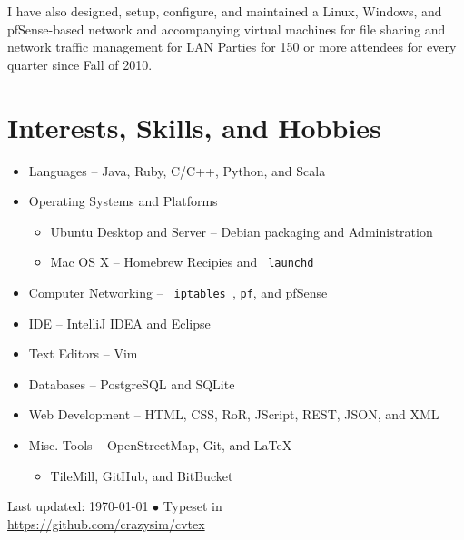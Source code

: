 \documentclass[10pt,a4paper]{article}
\begin{document}
I have also designed, setup, configure, and maintained a Linux, Windows, and pfSense-based
network and accompanying virtual machines for file sharing and network traffic
management for LAN Parties for 150 or more attendees for every quarter since Fall of 2010.

\section*{Interests, Skills, and Hobbies}

\begin{itemize}
    \item Languages -- Java, Ruby, C/C++, Python, and Scala
    \item Operating Systems and Platforms
        \begin{itemize}
            \item Ubuntu Desktop and Server -- Debian packaging and Administration
            \item Mac OS X -- Homebrew Recipies and \texttt{ launchd }
        \end{itemize}
    \item Computer Networking -- \texttt{ iptables }, \texttt{pf}, and pfSense
    \item IDE -- IntelliJ IDEA and Eclipse
    \item Text Editors -- Vim
    \item Databases -- PostgreSQL and SQLite
    \item Web Development -- HTML, CSS, RoR, JScript, REST, JSON, and XML
    \item Misc. Tools -- OpenStreetMap, Git, and \LaTeX
        \begin{itemize}
            \item TileMill, GitHub, and BitBucket
        \end{itemize}
\end {itemize}




\vfill{}

\begin{center}
{\scriptsize  Last updated: \today\- $\bullet$\- 
Typeset in \href{http://nitens.org/taraborelli/cvtex}{\XeTeX}\\
\href{https://github.com/crazysim/cvtex}{https://github.com/crazysim/cvtex}}
\end{center}
\end{document}
